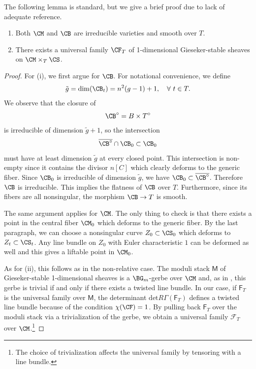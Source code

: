 The following lemma is standard, but we give a brief proof due to lack of adequate reference.
\begin{lem}
\notready\label{lem4.1}
\begin{enumerate}
\item[(i)] Both $\CM$ and $\CB$ are irreducible varieties and smooth over $T$.
\item[(ii)] There exists a universal family $\CF_T$ of 1-dimensional Gieseker-stable sheaves on $\CM\times_{T} \CS$.
\end{enumerate}
\end{lem}
\begin{proof}

For (i), we first argue for $\CB$. For notational convenience, we define
\[
\tilde{g} = \mathrm{dim}(\CB_t) = n^2(g-1)+1, \quad \forall~t \in T.
\]
We observe that the closure of
\[
\CB^{\circ} = B \times T^\circ
\]
is irreducible of dimension $\tilde{g}+1$, so the intersection
\[
\overline{\CB^{\circ}}\cap \CB_0 \subset \CB_0
\]
must have at least dimension $\tilde{g}$ at every closed point.  This intersection is non-empty since it contains the divisor $n[C]$ which clearly deforms to the generic fiber. Since $\CB_0$ is irreducible of dimension $\tilde{g}$, we have $\CB_0 \subset \overline{\CB^{\circ}}$. Therefore $\CB$ is irreducible. This implies the flatness of $\CB$ over $T$. Furthermore, since its fibers are all nonsingular, the morphism $\CB \to T$ is smooth.

The same argument applies for $\CM$. The only thing to check is that there exists a point in the central fiber $\CM_0$ which deforms to the generic fiber.  By the last paragraph, we can choose a nonsingular curve $Z_0 \subset \CS_0$ which deforms to $Z_t \subset \CS_t$.  Any line bundle on $Z_0$ with Euler characteristic $1$ can be deformed as well and this gives a liftable point in $\CM_0$.

As for (ii), this follows as in the non-relative case. The moduli stack $\mathsf{M}$ of Gieseker-stable 1-dimensional sheaves is a $\BG_m$-gerbe over $\CM$ and, as in \cite{Lieb}, this gerbe is trivial if and only if there exists a twisted line bundle.  In our case, if $\mathsf{F}_T$ is the universal family over $\mathsf{M}$, the determinant $\mathrm{det}R\Gamma(\mathsf{F}_T)$ defines a twisted line bundle because of the condition $\chi(\CF)  =1$.  By pulling back $\mathsf{F}_T$ over the moduli stack via a trivialization of the gerbe, we obtain a universal family $\mathcal{F}_T$ over $\CM$.\footnote{The choice of trivialization affects the universal family by tensoring with a line bundle.}
\end{proof}


